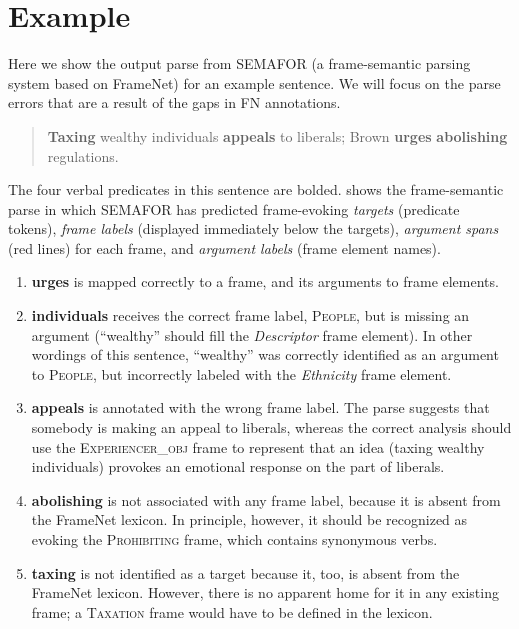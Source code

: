\documentclass[11pt]{article}
\newcommand{\ensuretext}[1]{#1}
\newcommand{\nssmarker}{\ensuretext{\textcolor{magenta}{\ensuremath{^{\textsc{NS}}_{\textsc{S}}}}}}
\newcommand{\arkcomment}[3]{\ensuretext{\textcolor{#3}{[#1 #2]}}}
\newcommand{\nss}[1]{\arkcomment{\nssmarker}{#1}{magenta}}
\newcommand{\finalversion}[1]{}
\newcommand{\longversion}[1]{} %
\newcommand{\vpred}[1]{\textbf{#1}} %
\newcommand{\fname}[1]{\textsc{#1}} %
\newcommand{\rname}[1]{\textsl{#1}} %
\begin{document}
\section{Example}\label{sec:example}
Here we show the output parse from SEMAFOR (a frame-semantic parsing system based on FrameNet) for an example sentence. 
We will focus on the parse errors that are a result of the gaps in FN annotations.
\begin{quote}
\vpred{Taxing} wealthy individuals \vpred{appeals} to liberals; Brown \vpred{urges} \vpred{abolishing} regulations.
\end{quote}
The four verbal predicates in this sentence are bolded. %
 shows the frame-semantic parse in which SEMAFOR 
has predicted frame-evoking \emph{targets} (predicate tokens), 
\emph{frame labels} (displayed immediately below the targets), 
\emph{argument spans} (red lines) for each frame, and 
\emph{argument labels} (frame element names).
\begin{enumerate}
\item \vpred{urges} is mapped correctly to a frame, and its arguments to frame elements.
\item \vpred{individuals} receives the correct frame label, \fname{People}, but is missing an argument
(``wealthy'' should fill the \rname{Descriptor} frame element). In other wordings of this sentence,
``wealthy'' was correctly identified as an argument to \fname{People}, but incorrectly labeled
with the \rname{Ethnicity} frame element.
  \item \vpred{appeals} is annotated with the wrong frame label. The parse suggests that somebody is 
  making an appeal to liberals, whereas the correct analysis should use the \fname{Experiencer\_obj} frame 
  to represent that an idea (taxing wealthy individuals) provokes an emotional response on the part of liberals. 
  \item \vpred{abolishing} is not associated with any frame label, because it is absent from the FrameNet lexicon. 
  In principle, however, it should be recognized as evoking the \fname{Prohibiting} frame, which contains 
  synonymous verbs. 
  \item \vpred{taxing} is not identified as a target because it, too, is absent from the FrameNet lexicon. 
  However, there is no apparent home for it in any existing frame; a \fname{Taxation} frame would have to be defined 
  in the lexicon.\longversion{\footnote{As part of the definition process the frame would be linked to related concepts that already have frames, 
  such as \fname{Government\_institution}, \fname{Imposing\_obligation}, and \fname{Commerce\_collect}.}}
\end{enumerate}
\end{document}
